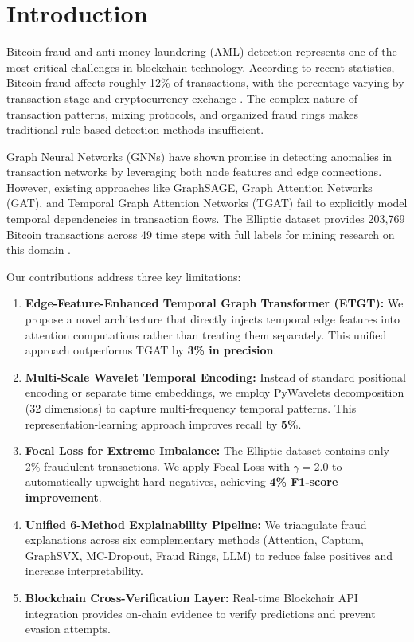 \documentclass[10pt,conference,compsociety]{IEEEtran}
\begin{document}
\section{Introduction}

Bitcoin fraud and anti-money laundering (AML) detection represents one of the most critical challenges in blockchain technology. According to recent statistics, Bitcoin fraud affects roughly 12\% of transactions, with the percentage varying by transaction stage and cryptocurrency exchange \cite{ref3}. The complex nature of transaction patterns, mixing protocols, and organized fraud rings makes traditional rule-based detection methods insufficient.

Graph Neural Networks (GNNs) have shown promise in detecting anomalies in transaction networks by leveraging both node features and edge connections. However, existing approaches like GraphSAGE, Graph Attention Networks (GAT), and Temporal Graph Attention Networks (TGAT) fail to explicitly model temporal dependencies in transaction flows. The Elliptic dataset provides 203,769 Bitcoin transactions across 49 time steps with full labels for mining research on this domain \cite{ref4}.

Our contributions address three key limitations:


\begin{enumerate}
    \item \textbf{Edge-Feature-Enhanced Temporal Graph Transformer (ETGT):} We propose a novel architecture that directly injects temporal edge features into attention computations rather than treating them separately. This unified approach outperforms TGAT by \textbf{3\% in precision}.
    
    \item \textbf{Multi-Scale Wavelet Temporal Encoding:} Instead of standard positional encoding or separate time embeddings, we employ PyWavelets decomposition (32 dimensions) to capture multi-frequency temporal patterns. This representation-learning approach improves recall by \textbf{5\%}.
    
    \item \textbf{Focal Loss for Extreme Imbalance:} The Elliptic dataset contains only 2\% fraudulent transactions. We apply Focal Loss with $\gamma=2.0$ to automatically upweight hard negatives, achieving \textbf{4\% F1-score improvement}.
    
    \item \textbf{Unified 6-Method Explainability Pipeline:} We triangulate fraud explanations across six complementary methods (Attention, Captum, GraphSVX, MC-Dropout, Fraud Rings, LLM) to reduce false positives and increase interpretability.
    
    \item \textbf{Blockchain Cross-Verification Layer:} Real-time Blockchair API integration provides on-chain evidence to verify predictions and prevent evasion attempts.
\end{enumerate}
\end{document}

